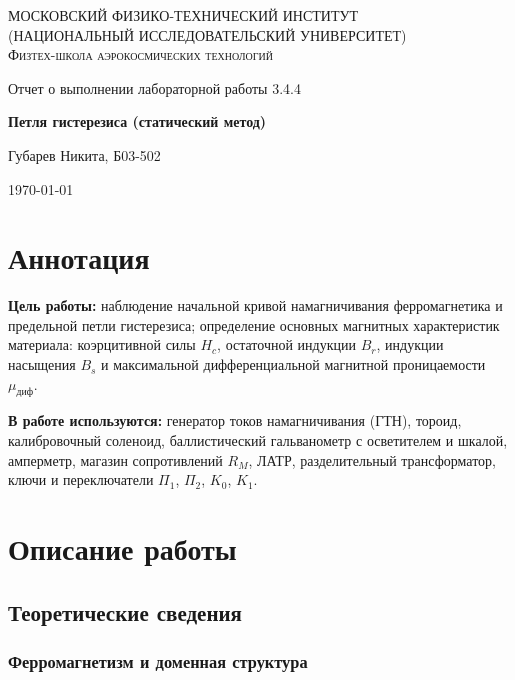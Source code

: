 \documentclass[a4paper]{article}
\begin{document}
	
	\begin{titlepage}
		\centering
		{\scshape\Large МОСКОВСКИЙ ФИЗИКО-ТЕХНИЧЕСКИЙ ИНСТИТУТ \\
			(НАЦИОНАЛЬНЫЙ ИССЛЕДОВАТЕЛЬСКИЙ УНИВЕРСИТЕТ)\\
			Физтех-школа аэрокосмических технологий}
		
		\vspace{4cm}
		{\LARGE Отчет о выполнении лабораторной работы 3.4.4}
		\vspace{1cm}
		
		{\huge\bf Петля гистерезиса (статический метод)}
		
		\vspace{1cm}
		\vfill
		
		\begin{flushright}
			{\LARGE Губарев Никита, Б03-502}
		\end{flushright}
		\vfill 
		\today
	\end{titlepage}
	
	\tableofcontents
	
	\section{Аннотация}
	
	\textbf{Цель работы:} наблюдение начальной кривой намагничивания ферромагнетика и предельной петли гистерезиса; определение основных магнитных характеристик материала: коэрцитивной силы $H_c$, остаточной индукции $B_r$, индукции насыщения $B_s$ и максимальной дифференциальной магнитной проницаемости $\mu_{\text{диф}}$.
	
	\textbf{В работе используются:} генератор токов намагничивания (ГТН), тороид, калибровочный соленоид, баллистический гальванометр с осветителем и шкалой, амперметр, магазин сопротивлений $R_M$, ЛАТР, разделительный трансформатор, ключи и переключатели $\Pi_1$, $\Pi_2$, $K_0$, $K_1$.
	
	\section{Описание работы}
	
	\subsection{Теоретические сведения}
	
	\subsubsection{Ферромагнетизм и доменная структура}
	
\end{document}
